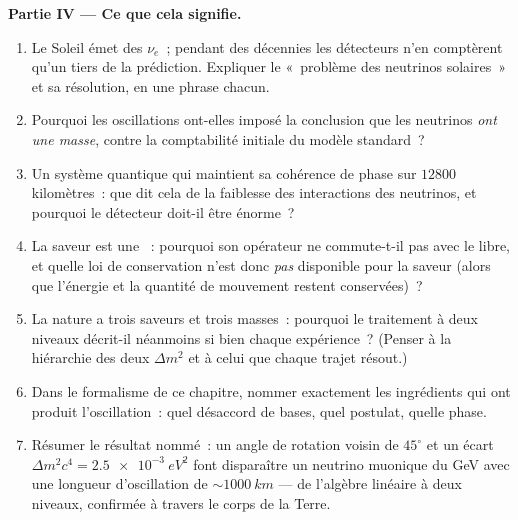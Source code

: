 \begin{problem}
\medskip\noindent\textbf{Partie IV --- Ce que cela signifie.}
\begin{enumerate}[resume]
  \item Le Soleil émet des $\nu_e$~; pendant des décennies les
        détecteurs n'en comptèrent qu'un tiers de la prédiction.
        Expliquer le «~problème des neutrinos solaires~» et sa
        résolution, en une phrase chacun.
  \item Pourquoi les oscillations ont-elles imposé la conclusion que
        les neutrinos \emph{ont une masse}, contre la comptabilité
        initiale du modèle standard~?
  \item Un système quantique qui maintient sa cohérence de phase sur
        $12800$ kilomètres~: que dit cela de la faiblesse des
        interactions des neutrinos, et pourquoi le détecteur
        doit-il être énorme~?
  \item La saveur est une ~: pourquoi son opérateur ne
        commute-t-il pas avec le  libre, et quelle loi de
        conservation n'est donc \emph{pas} disponible pour la saveur
        (alors que l'énergie et la quantité de mouvement restent
        conservées)~?
  \item La nature a trois saveurs et trois masses~: pourquoi le
        traitement à deux niveaux décrit-il néanmoins si bien chaque
        expérience~? (Penser à la hiérarchie des deux $\Delta m^2$
        et à celui que chaque trajet résout.)
  \item Dans le formalisme de ce chapitre, nommer exactement les
        ingrédients qui ont produit l'oscillation~: quel désaccord de
        bases, quel postulat, quelle phase.
  \item Résumer le résultat nommé~: un angle de rotation voisin de
        $45^\circ$ et un écart $\Delta m^2c^4 =
        \qty{2.5e-3}{eV^2}$ font disparaître un neutrino muonique du
        GeV avec une longueur d'oscillation de
        $\sim\qty{1000}{km}$ --- de l'algèbre linéaire à deux
        niveaux, confirmée à travers le corps de la Terre.
\end{enumerate}
\end{problem}
